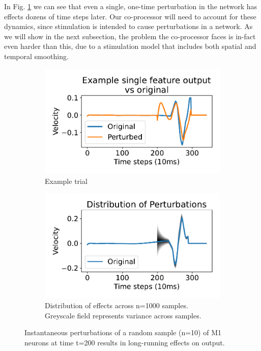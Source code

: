 \documentclass[12pt]{iopart}
\begin{document}
In Fig. \ref{fig:dynamics} we can see that even a single, one-time perturbation in
the network has effects dozens of time steps later. Our co-processor will need to
account for these dynamics, since stimulation is intended to cause perturbations
in a network. As we will show in the next subsection, the problem the co-processor faces
is in-fact even harder than this, due to a stimulation model that includes both
spatial and temporal smoothing.

\begin{figure}[h]
	\centering
	\begin{subfigure}[c]{0.48\textwidth}
	    \centering
	    \includegraphics[width=\textwidth]{perturbe_single.pdf}
	    \caption{Example trial}
	\end{subfigure}
	\hfill
	\begin{subfigure}[c]{0.48\textwidth}
	    \centering
	    \includegraphics[width=\textwidth]{perturbe_dist.pdf}
	    \caption{Distribution of effects across n=1000 samples. Greyscale
	             field represents variance across samples.}
	\end{subfigure}
	\hfill
	\caption{Instantaneous perturbations of a random sample (n=10) of M1
	         neurons at time t=200 results in long-running effects on output.}
	\label{fig:dynamics}
\end{figure}
\end{document}
